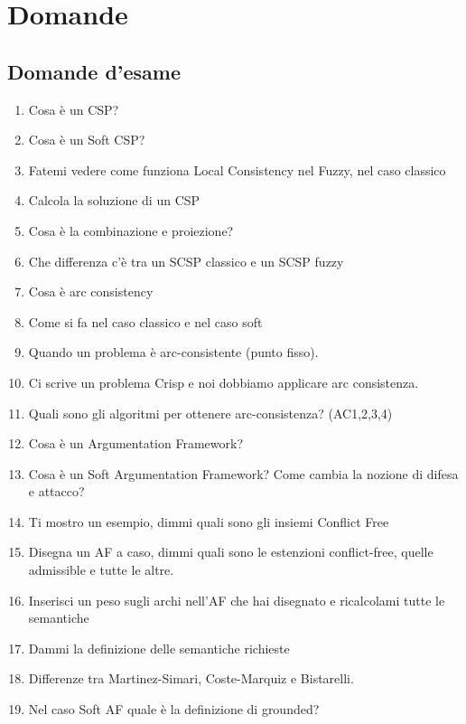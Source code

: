 \chapter{Domande} \label{Domande}
\section{Domande d'esame}
\begin{enumerate}
    \item Cosa è un CSP?
    \item Cosa è un Soft CSP?
    \item Fatemi vedere come funziona Local Consistency nel Fuzzy, nel caso classico
    \item Calcola la soluzione di un CSP
    \item Cosa è la combinazione e proiezione?
    \item Che differenza c'è tra un SCSP classico e un SCSP fuzzy
    \item Cosa è arc consistency
    \item Come si fa nel caso classico e nel caso soft
    \item Quando un problema è arc-consistente (punto fisso).
    \item Ci scrive un problema Crisp e noi dobbiamo applicare arc consistenza.
    \item Quali sono gli algoritmi per ottenere arc-consistenza? (AC1,2,3,4)
    \item Cosa è un Argumentation Framework?
    \item Cosa è un Soft Argumentation Framework? Come cambia la nozione di difesa e attacco?
    \item Ti mostro un esempio, dimmi quali sono gli insiemi Conflict Free
    \item Disegna un AF a caso, dimmi quali sono le estenzioni conflict-free, quelle admissible e tutte le altre.
    \item Inserisci un peso sugli archi nell'AF che hai disegnato e ricalcolami tutte le semantiche
    \item Dammi la definizione delle semantiche richieste
    \item Differenze tra Martinez-Simari, Coste-Marquiz e Bistarelli.
    \item Nel caso Soft AF quale è la definizione di grounded?
\end{enumerate}



